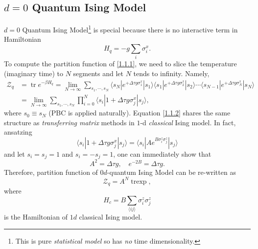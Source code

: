 \documentclass[10pt,nofootinbib]{revtex4}
\numberwithin{equation}{section}
\begin{document}
	\subsection{$d=0$ Quantum Ising Model}
		$d=0$ Quantum Ising Model\footnote{This is pure \emph{statistical model} so has \emph{no} time dimensionality.} is special because there is no interactive term in Hamiltonian
		\begin{equation}\label{1.1.1}
			H_{q}=-g\sum_i\sigma_i^x.
		\end{equation}
		To compute the partition function of \eqref{1.1.1}, we need to slice the temperature (imaginary time) to $N$ segments and let $N$ tends to infinity. Namely,
		\begin{align}\label{1.1.2}
			\mathcal{Z}_{q}&=\mathop{\mathrm{tr}}e^{-\beta H_q}=\lim_{N\rightarrow\infty}\sum_{s_1,\cdots,s_N}\langle s_N|e^{+\Delta\tau g\sigma^x_1}|s_1\rangle \langle s_1|e^{+\Delta\tau g\sigma_2^x}|s_2\rangle\cdots \langle s_{N-1}|e^{+\Delta\tau g\sigma^x_N}|s_N\rangle\nonumber\\
			&=\lim_{N\rightarrow\infty}\sum_{s_1,\cdots,s_N}\prod_{i=0}^N\langle s_i|1+\Delta\tau g\sigma_j^x|s_j\rangle,
		\end{align}
		where $s_0\equiv s_N$ (PBC is applied naturally). Equation \eqref{1.1.2} shares the same structure as \emph{transferring matrix} methods in $1$-d \emph{classical} Ising model. In fact, ansatzing
		\begin{equation*}
			\langle s_i|1+\Delta\tau g\sigma_j^x|s_j\rangle= \langle s_i|Ae^{B\sigma_i^z\sigma_j^z}|s_j\rangle
		\end{equation*}
		and let $s_i=s_j=1$ and $s_i=-s_j=1$, one can immediately show that
		\begin{equation}\label{1.1.3}
			A^2=\Delta \tau g,\quad e^{-2B}=\Delta\tau g.
		\end{equation}
		Therefore, partition function of $0d$-quantum Ising Model can be re-written as
		\begin{equation}\label{1.1.4}
			\mathcal{Z}_{q}=A^N\mathop{\mathrm{tr}\exp \left(-\beta H_{c}\right) },
		\end{equation}
		where
		\begin{equation}\label{1.1.5}
			H_{c}=B\sum_{\langle ij\rangle}\sigma_i^z\sigma_j^z
		\end{equation}
		is the Hamiltonian of $1d$ classical Ising model.
\end{document}
